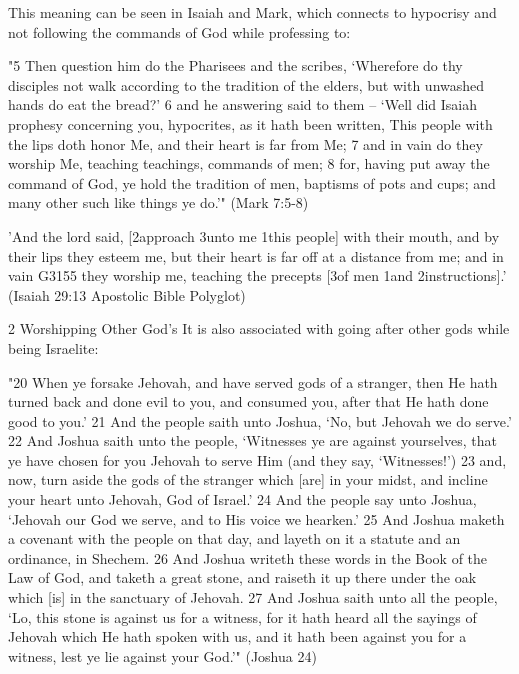 \documentclass[11pt]{article}
\begin{document}
This meaning can be seen in Isaiah and Mark, which connects to hypocrisy and not following the commands of God while professing to:

"5 Then question him do the Pharisees and the scribes, `Wherefore do thy disciples not walk according to the tradition of the elders, but with unwashed hands do eat the bread?'
6 and he answering said to them -- `Well did Isaiah prophesy concerning you, hypocrites, as it hath been written, This people with the lips doth honor Me, and their heart is far from Me;
7 and in vain do they worship Me, teaching teachings, commands of men;
8 for, having put away the command of God, ye hold the tradition of men, baptisms of pots and cups; and many other such like things ye do.'"
(Mark 7:5-8)\newline

'And the lord said, [2approach 3unto me 1this people] with their mouth, and by their lips they esteem me, but their heart is far off at a distance from me; and in vain G3155 they worship me, teaching the precepts [3of men 1and 2instructions].'
(Isaiah 29:13 Apostolic Bible Polyglot)\newline

{\Large 2 Worshipping Other God's}\newline
It is also associated with going after other gods while being Israelite:

"20 When ye forsake Jehovah, and have served gods of a stranger, then He hath turned back and done evil to you, and consumed you, after that He hath done good to you.'
21 And the people saith unto Joshua, `No, but Jehovah we do serve.'
22 And Joshua saith unto the people, `Witnesses ye are against yourselves, that ye have chosen for you Jehovah to serve Him (and they say, `Witnesses!')
23 and, now, turn aside the gods of the stranger which [are] in your midst, and incline your heart unto Jehovah, God of Israel.'
24 And the people say unto Joshua, `Jehovah our God we serve, and to His voice we hearken.'
25 And Joshua maketh a covenant with the people on that day, and layeth on it a statute and an ordinance, in Shechem.
26 And Joshua writeth these words in the Book of the Law of God, and taketh a great stone, and raiseth it up there under the oak which [is] in the sanctuary of Jehovah.
27 And Joshua saith unto all the people, `Lo, this stone is against us for a witness, for it hath heard all the sayings of Jehovah which He hath spoken with us, and it hath been against you for a witness, lest ye lie against your God.'" (Joshua 24)\newline
\end{document}

